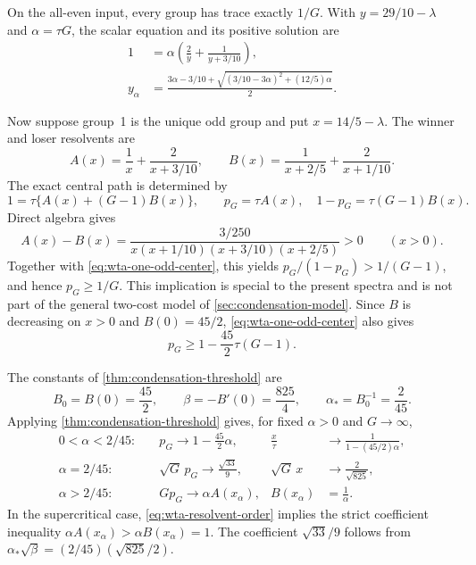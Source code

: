 On the all-even input, every group has trace exactly $1/G$.  With
$y=29/10-\lambda$ and $\alpha=\tau G$, the scalar equation and its positive
solution are
\begin{align}
 1&=\alpha\left(\frac2y+\frac1{y+3/10}\right),
 \label{eq:wta-even-secular}\\
 y_\alpha&=\frac{3\alpha-3/10+
 \sqrt{(3/10-3\alpha)^2+(12/5)\alpha}}2.
 \label{eq:wta-even-root}
\end{align}

Now suppose group~1 is the unique odd group and put $x=14/5-\lambda$.  The
winner and loser resolvents are
\begin{equation}
 A(x)=\frac1x+\frac2{x+3/10},
 \qquad
 B(x)=\frac1{x+2/5}+\frac2{x+1/10}.
 \label{eq:wta-resolvents}
\end{equation}
The exact central path is determined by
\begin{equation}
 \boxed{1=\tau\{A(x)+(G-1)B(x)\}},
 \qquad
 \boxed{p_G=\tau A(x),\quad1-p_G=\tau(G-1)B(x)}.
 \label{eq:wta-one-odd-center}
\end{equation}
Direct algebra gives
\begin{equation}
 A(x)-B(x)=
 \frac{3/250}{x(x+1/10)(x+3/10)(x+2/5)}>0
 \qquad(x>0).
 \label{eq:wta-resolvent-order}
\end{equation}
Together with \eqref{eq:wta-one-odd-center}, this yields
$p_G/(1-p_G)>1/(G-1)$, and hence $p_G\ge1/G$.  This implication is special
to the present spectra and is not part of the general two-cost model of
\cref{sec:condensation-model}.
Since $B$ is decreasing on $x>0$ and $B(0)=45/2$,
\eqref{eq:wta-one-odd-center} also gives
\begin{equation}
 p_G\ge1-\frac{45}{2}\tau(G-1).
 \label{eq:wta-finite-mass}
\end{equation}

The constants of \cref{thm:condensation-threshold} are
\begin{equation}
 B_0=B(0)=\frac{45}{2},\qquad
 \beta=-B'(0)=\frac{825}{4},\qquad
 \boxed{\alpha_*=B_0^{-1}=\frac2{45}}.
 \label{eq:wta-critical-constants}
\end{equation}
Applying \cref{thm:condensation-threshold} gives, for fixed $\alpha>0$ and
$G\to\infty$,
\begin{align}
 0<\alpha<2/45:&\quad
 p_G\longrightarrow1-\frac{45}{2}\alpha,
 &\frac{x}{\tau}&\longrightarrow
       \frac1{1-(45/2)\alpha},
 \label{eq:wta-subcritical}\\
 \alpha=2/45:&\quad
 \sqrt G\,p_G\longrightarrow\frac{\sqrt{33}}9,
 &\sqrt G\,x&\longrightarrow\frac2{\sqrt{825}},
 \label{eq:wta-critical}\\
 \alpha>2/45:&\quad
 Gp_G\longrightarrow\alpha A(x_\alpha),
 &B(x_\alpha)&=\frac1\alpha.
 \label{eq:wta-supercritical}
\end{align}
In the supercritical case, \eqref{eq:wta-resolvent-order} implies the strict
coefficient inequality $\alpha A(x_\alpha)>\alpha B(x_\alpha)=1$.
The coefficient $\sqrt{33}/9$ follows from
$\alpha_*\sqrt\beta=(2/45)(\sqrt{825}/2)$.

